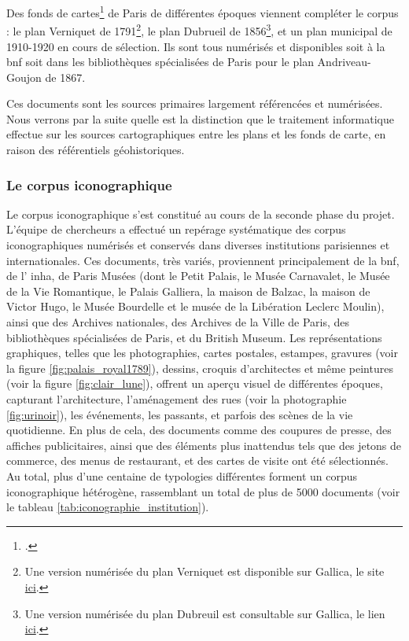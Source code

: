 Des fonds de cartes\footcite{ESRIDefinition2024} de Paris de différentes époques viennent compléter le corpus : le plan Verniquet de 1791\footnote{Une version numérisée du plan Verniquet est disponible sur Gallica, le site \href{https://gallica.bnf.fr/view3if/ga/ark:/12148/btv1b55013275x}{ici}.}, le plan Dubrueil de 1856\footnote{Une version numérisée du plan Dubreuil est consultable sur Gallica, le lien \href{https://gallica.bnf.fr/view3if/ga/ark:/12148/btv1b53085562p}{ici}.}, et un plan municipal de 1910-1920 en cours de sélection. Ils sont tous numérisés et disponibles soit à la \acrshort{bnf} soit dans les bibliothèques spécialisées de Paris pour le plan Andriveau-Goujon de 1867.

Ces documents sont les sources primaires largement référencées et numérisées. Nous verrons par la suite quelle est la distinction que le traitement informatique effectue sur les sources cartographiques entre les plans et les fonds de carte, en raison des référentiels géohistoriques.
 
\subsubsection{Le corpus iconographique}

Le corpus iconographique s'est constitué au cours de la seconde phase du projet. L'équipe de chercheurs a effectué un repérage systématique des corpus iconographiques numérisés et conservés dans diverses institutions parisiennes et internationales. Ces documents, très variés, proviennent principalement de la \acrshort{bnf}, de l' \acrshort{inha}, de Paris Musées (dont le Petit Palais, le Musée Carnavalet, le Musée de la Vie Romantique, le Palais Galliera, la maison de Balzac, la maison de Victor Hugo, le Musée Bourdelle et le musée de la Libération Leclerc Moulin), ainsi que des Archives nationales, des Archives de la Ville de Paris, des bibliothèques spécialisées de Paris, et du British Museum. Les représentations graphiques, telles que les photographies, cartes postales, estampes, gravures (voir la figure \ref{fig:palais_royal1789}), dessins, croquis d'architectes et même peintures (voir la figure \ref{fig:clair_lune}), offrent un aperçu visuel de différentes époques, capturant l'architecture, l'aménagement des rues (voir la photographie \ref{fig:urinoir}), les événements, les passants, et parfois des scènes de la vie quotidienne. En plus de cela, des documents comme des coupures de presse, des affiches publicitaires, ainsi que des éléments plus inattendus tels que des jetons de commerce, des menus de restaurant, et des cartes de visite ont été sélectionnés. Au total, plus d'une centaine de typologies différentes forment un corpus iconographique hétérogène, rassemblant un total de plus de 5000 documents (voir le tableau \ref{tab:iconographie_institution}).

